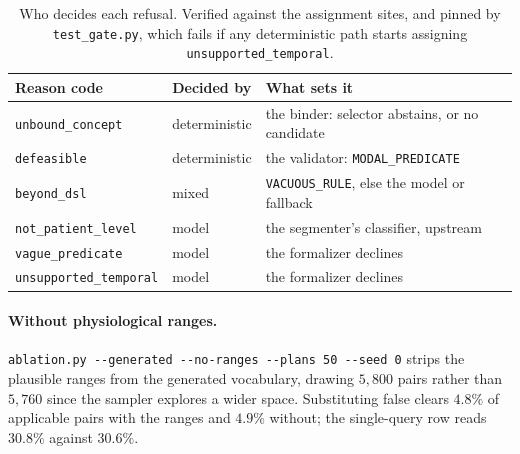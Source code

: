 \documentclass{article}
\begin{document}
\begin{table}[h]
  \centering
  \caption{Who decides each refusal. Verified against the assignment sites, and
  pinned by \texttt{test\_gate.py}, which fails if any deterministic path starts
  assigning \texttt{unsupported\_temporal}.}
  \label{tab:attribution}
  \begin{tabular}{lll}
    \toprule
    Reason code & Decided by & What sets it \\
    \midrule
    \texttt{unbound\_concept}      & deterministic & the binder: selector abstains, or no candidate \\
    \texttt{defeasible}            & deterministic & the validator: \texttt{MODAL\_PREDICATE} \\
    \texttt{beyond\_dsl}           & mixed         & \texttt{VACUOUS\_RULE}, else the model or fallback \\
    \texttt{not\_patient\_level}   & model         & the segmenter's classifier, upstream \\
    \texttt{vague\_predicate}      & model         & the formalizer declines \\
    \texttt{unsupported\_temporal} & model         & the formalizer declines \\
    \bottomrule
  \end{tabular}
\end{table}

\paragraph{Without physiological ranges.}
\texttt{ablation.py -{}-generated -{}-no-ranges -{}-plans 50 -{}-seed 0}
strips the plausible ranges from the generated vocabulary, drawing $5{,}800$
pairs rather than $5{,}760$ since the sampler explores a wider space.
Substituting \textsf{false} clears $4.8\%$ of applicable pairs with the ranges
and $4.9\%$ without; the single-query row reads $30.8\%$ against $30.6\%$.






%
\end{document}
